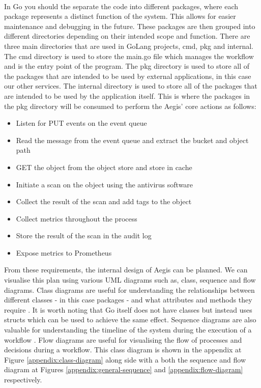 \documentclass[12pt, conference, final, a4paper, onecolumn, compsoc]{IEEEtran}
\begin{document}
\paragraph{}

In Go you should the separate the code into different packages, where each
package represents a distinct function of the system. This allows for easier
maintenance and debugging in the future. These packages are then grouped into
different directories depending on their intended scope and function. There are
three main directories that are used in GoLang projects, cmd, pkg and internal.
The cmd directory is used to store the main.go file which manages the workflow
and is the entry point of the program. The pkg directory is used to store all of
the packages that are intended to be used by external applications, in this case
our other services. The internal directory is used to store all of the packages
that are intended to be used by the application itself. This is where the
packages in the pkg directory will be consumed to perform the Aegis' core
actions as follows:

\begin{itemize}
  \item Listen for PUT events on the event queue
  \item Read the message from the event queue and extract the bucket and object
        path
  \item GET the object from the object store and store in cache
  \item Initiate a scan on the object using the antivirus software
  \item Collect the result of the scan and add tags to the object
  \item Collect metrics throughout the process
  \item Store the result of the scan in the audit log
  \item Expose metrics to Prometheus
\end{itemize}

From these requirements, the internal design of Aegis can be planned. We can
visualise this plan using various UML diagrams such as, class, sequence and flow
diagrams. Class diagrams are useful for understanding the relationships between
different classes - in this case packages - and what attributes and methods they
require \citep{class-diagrams}. It is worth noting that Go itself does not have
classes but instead uses structs which can be used to achieve the same effect.
Sequence diagrams are also valuable for understanding the timeline of the system
during the execution of a workflow \citep{uml-diagrams}. Flow diagrams are
useful for visualising the flow of processes and decisions during a workflow.
This class diagram is shown in the appendix at Figure
\ref{appendix:class-diagram} along side with a both the sequence and flow
diagram at Figures \ref{appendix:general-sequence} and
\ref{appendix:flow-diagram} respectively.
\end{document}
